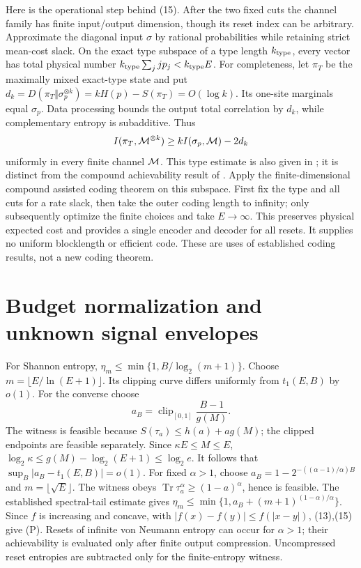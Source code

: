 \documentclass[11pt]{article}
\newcommand{\Tr}{\operatorname{Tr}}
\begin{document}
Here is the operational step behind (15).
After the two fixed cuts the channel family has finite input/output
dimension, though its reset index can be arbitrary.
Approximate the diagonal input \(\sigma\) by rational probabilities
while retaining strict mean-cost slack. On the exact type subspace of
a type length \(k_{\rm type}\), every vector has total physical number
\(k_{\rm type}\sum_j jp_j<k_{\rm type}E\).
For completeness, let \(\pi_T\) be the maximally mixed exact-type state
and put \(d_k=D(\pi_T\Vert\sigma_p^{\otimes k})
=kH(p)-S(\pi_T)=O(\log k)\). Its one-site marginals equal \(\sigma_p\).
Data processing bounds the output total correlation by \(d_k\), while
complementary entropy is subadditive. Thus
\[
 I(\pi_T,{\cal M}^{\otimes k})
 \ge kI(\sigma_p,{\cal M})-2d_k
\]
uniformly in every finite channel \({\cal M}\).
This type estimate is also given in \cite[Lemma~3]{previous};
it is distinct from the compound achievability result of
\cite[Lemma~9]{compound}.
Apply the finite-dimensional compound assisted coding theorem
\cite[Theorem~1]{compound} on this subspace. First fix the type and
all cuts for a rate slack, then take the outer coding length to infinity;
only subsequently optimize the finite choices and take \(E\to\infty\).
This preserves physical expected cost and provides a single encoder
and decoder for all resets. It supplies no uniform blocklength or
efficient code. These are uses of established coding results, not
a new coding theorem.

\section{Budget normalization and unknown signal envelopes}
For Shannon entropy,
\(\eta_m\le\min\{1,B/\log_2(m+1)\}\).
Choose \(m=\lfloor E/\ln(E+1)\rfloor\).
Its clipping curve differs uniformly from \(t_1(E,B)\) by \(o(1)\).
For the converse choose
\[
 a_B=\operatorname{clip}_{[0,1]}\frac{B-1}{g(M)}.
\]
The witness is feasible because \(S(\tau_a)\le h(a)+ag(M)\);
the clipped endpoints are feasible separately.
Since \(\kappa E\le M\le E\),
\(\log_2\kappa\le g(M)-\log_2(E+1)\le\log_2e\).
It follows that \(\sup_B|a_B-t_1(E,B)|=o(1)\).
For fixed \(\alpha>1\), choose
\(a_B=1-2^{-((\alpha-1)/\alpha)B}\) and \(m=\lfloor\sqrt E\rfloor\).
The witness obeys \(\Tr\tau_a^\alpha\ge(1-a)^\alpha\), hence is feasible.
The established spectral-tail estimate gives
\(\eta_m\le\min\{1,a_B+(m+1)^{(1-\alpha)/\alpha}\}\).
Since \(f\) is increasing and concave, with
\(|f(x)-f(y)|\le f(|x-y|)\), (13),(15) give (P).
Resets of infinite von Neumann entropy can occur for \(\alpha>1\);
their achievability is evaluated only after finite output compression.
Uncompressed reset entropies are subtracted only for the finite-entropy
witness.
\end{document}
